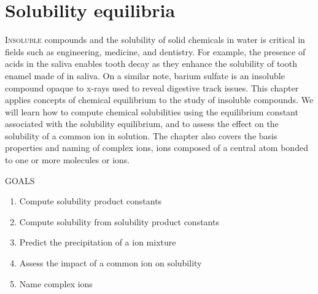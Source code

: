 \documentclass[main.tex]{subfiles}
\begin{document}
\chapter[Solubility equilibria ]{Solubility equilibria}


\begin{marginfigure}
\end{marginfigure}



   
\lettrine[lines=4]{\color{black!45}I}{nsoluble} compounds and the solubility of solid chemicals in water is critical in fields such as engineering, medicine, and dentistry. For example, the presence of acids in the saliva enables tooth decay as they enhance the solubility of tooth enamel made of  in saliva. On a similar note, barium sulfate is an insoluble compound opaque to x-rays used to reveal digestive track issues. This chapter applies concepts of chemical equilibrium to the study of insoluble compounds. We will learn how to compute chemical solubilities using the equilibrium constant associated with the solubility equilibrium, and to assess the effect on the solubility of a common ion in solution. The chapter also covers the basis properties and naming of complex ions, ions composed of a central atom bonded to one or more molecules or ions.
\begin{marginfigure}%
\begin{mytcbox}{GOALS}
\begin{enumerate}[label=\protect\circled{\color{white}\arabic*}]
\item Compute solubility product constants
\item Compute solubility from solubility product constants
\item Predict the precipitation of a ion mixture
\item Assess the impact of a common ion on solubility
\item Name complex ions
\end{enumerate}
\end{mytcbox}
\vspace{1cm}
\begin{tcolorbox}[enhanced,colback=red!5!white,colframe=black!50!red,boxrule=1pt,
  arc=0pt,outer arc=0pt,drop heavy lifted shadow]
\faGears\ 
 {\discussionSOLUBLE} \end{tcolorbox}

\end{marginfigure}%
\end{document}
